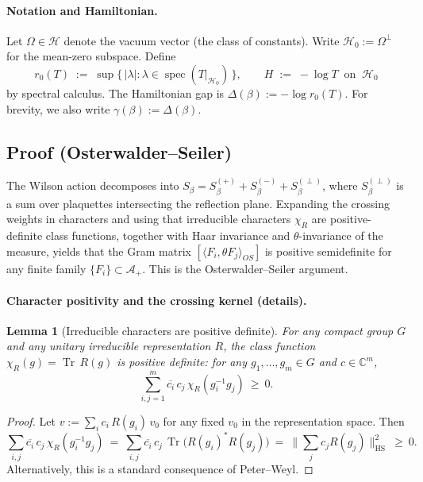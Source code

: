 \documentclass[11pt]{amsart}
\theoremstyle{plain}
\newtheorem{lemma}[theorem]{Lemma}
\theoremstyle{definition}
\theoremstyle{remark}
\begin{document}
\paragraph{Notation and Hamiltonian.}
Let $\Omega\in\mathcal H$ denote the vacuum vector (the class of constants). Write $\mathcal H_0:=\Omega^{\perp}$ for the mean-zero subspace. Define
\[
  r_0(T)\;:=\; \sup\{\,|\lambda| : \lambda\in\operatorname{spec}(T|_{\mathcal H_0})\,\},\qquad
  H\;:=\;-\log T\ \text{ on }\ \mathcal H_0
\]
by spectral calculus. The Hamiltonian gap is $\Delta(\beta):=-\log r_0(T)$.
For brevity, we also write $\gamma(\beta):=\Delta(\beta)$.

\subsection*{Proof (Osterwalder--Seiler)}
The Wilson action decomposes into $S_\beta=S_\beta^{(+)}+S_\beta^{(-)}+S_\beta^{(\perp)}$, where $S_\beta^{(\perp)}$ is a sum over plaquettes intersecting the reflection plane. Expanding the crossing weights in characters and using that irreducible characters $\chi_R$ are positive-definite class functions, together with Haar invariance and $\theta$-invariance of the measure, yields that the Gram matrix $[\langle F_i,\theta F_j\rangle_{OS}]$ is positive semidefinite for any finite family $\{F_i\}\subset \mathcal A_+$. This is the Osterwalder--Seiler argument.

\paragraph{Character positivity and the crossing kernel (details).}
\begin{lemma}[Irreducible characters are positive definite]\label{lem:char-pd}
For any compact group $G$ and any unitary irreducible representation $R$, the class function $\chi_R(g)=\operatorname{Tr}\,R(g)$ is positive definite: for any $g_1,\dots,g_m\in G$ and $c\in\mathbb C^m$,
\[
  \sum_{i,j=1}^m \overline{c_i}\,c_j\,\chi_R(g_i^{-1} g_j)\ \ge\ 0.
\]
\end{lemma}
\begin{proof}
Let $v:=\sum_i c_i\,R(g_i)\,v_0$ for any fixed $v_0$ in the representation space. Then
\[
  \sum_{i,j}\overline{c_i}\,c_j\,\chi_R(g_i^{-1} g_j)\ =\ \sum_{i,j}\overline{c_i}\,c_j\,\operatorname{Tr}\big(R(g_i)^{*}R(g_j)\big)\ =\ \|\sum_j c_j R(g_j)\|_{\mathrm{HS}}^2\ \ge\ 0.
\]
Alternatively, this is a standard consequence of Peter–Weyl.
\end{proof}
\end{document}
